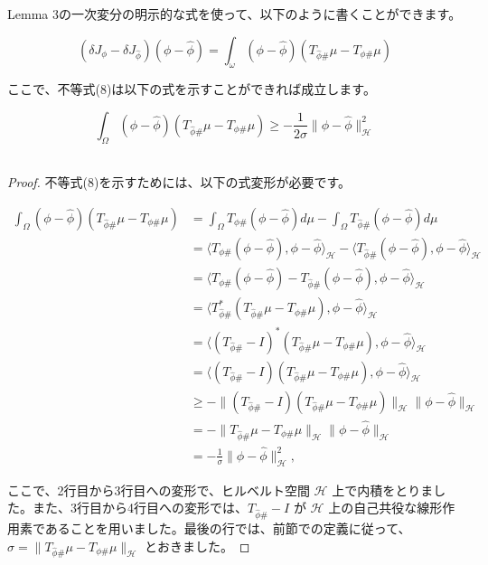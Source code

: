 \documentclass{jsarticle}
\theoremstyle{definition}
\begin{document}
Lemma 3の一次変分の明示的な式を使って、以下のように書くことができます。



$$
(\delta J_\phi - \delta J_{\hat{\phi}})(\phi - \hat{\phi}) = \int_\omega (\phi - \hat{\phi})(T_{\hat{\phi} \#} \mu - T_{\phi \#} \mu)
$$

ここで、不等式(8)は以下の式を示すことができれば成立します。

$$
\int_\Omega (\phi - \hat{\phi})(T_{\hat{\phi} \#} \mu - T_{\phi \#} \mu) \geq - \frac{1}{2\sigma} \|\phi - \hat{\phi}\|_\mathcal{H}^2
$$\\

\color{gray}
\begin{proof}
  
不等式(8)を示すためには、以下の式変形が必要です。

$$
\begin{aligned}
\int_\Omega (\phi - \hat{\phi})(T_{\hat{\phi} \#} \mu - T_{\phi \#} \mu) &= \int_\Omega T_{\phi \#}(\phi - \hat{\phi}) d\mu - \int_\Omega T_{\hat{\phi} \#}(\phi - \hat{\phi}) d\mu \\
&= \langle T_{\phi \#}(\phi - \hat{\phi}), \phi - \hat{\phi} \rangle_{\mathcal{H}} - \langle T_{\hat{\phi} \#}(\phi - \hat{\phi}), \phi - \hat{\phi} \rangle_{\mathcal{H}} \\
&= \langle T_{\phi \#}(\phi - \hat{\phi}) - T_{\hat{\phi} \#}(\phi - \hat{\phi}), \phi - \hat{\phi} \rangle_{\mathcal{H}} \\
&= \langle T_{\hat{\phi} \#}^*(T_{\hat{\phi} \#} \mu - T_{\phi \#} \mu), \phi - \hat{\phi} \rangle_{\mathcal{H}} \\
&= \langle (T_{\hat{\phi} \#} - I)^*(T_{\hat{\phi} \#} \mu - T_{\phi \#} \mu), \phi - \hat{\phi} \rangle_{\mathcal{H}} \\
&= \langle (T_{\hat{\phi} \#} - I)(T_{\hat{\phi} \#} \mu - T_{\phi \#} \mu), \phi - \hat{\phi} \rangle_{\mathcal{H}} \\
&\geq - \|(T_{\hat{\phi} \#} - I)(T_{\hat{\phi} \#} \mu - T_{\phi \#} \mu)\|_{\mathcal{H}} \|\phi - \hat{\phi}\|_{\mathcal{H}} \\
&= - \|T_{\hat{\phi} \#} \mu - T_{\phi \#} \mu\|_{\mathcal{H}} \|\phi - \hat{\phi}\|_{\mathcal{H}} \\
&= - \frac{1}{\sigma} \|\phi - \hat{\phi}\|_{\mathcal{H}}^2,
\end{aligned}
$$

ここで、2行目から3行目への変形で、ヒルベルト空間 $\mathcal{H}$ 上で内積をとりました。また、3行目から4行目への変形では、$T_{\hat{\phi} \#} - I$ が $\mathcal{H}$ 上の自己共役な線形作用素であることを用いました。最後の行では、前節での定義に従って、$\sigma = \|T_{\hat{\phi} \#} \mu - T_{\phi \#} \mu\|_{\mathcal{H}}$ とおきました。


\end{proof}
\end{document}
